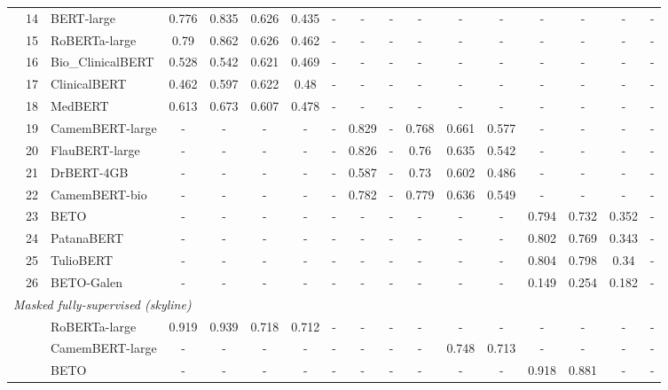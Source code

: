 {\begin{tabular}{lll|ccccc|ccccc|cccc}
 & 14 & BERT-large & 0.776 & 0.835 & 0.626 & 0.435 & - & - & - & - & - & - & - & - & - & - \\
 & 15 & RoBERTa-large & 0.79 & 0.862 & 0.626 & 0.462 & - & - & - & - & - & - & - & - & - & - \\
 & 16 & Bio\_ClinicalBERT & 0.528 & 0.542 & 0.621 & 0.469 & - & - & - & - & - & - & - & - & - & - \\
 & 17 & ClinicalBERT & 0.462 & 0.597 & 0.622 & 0.48 & - & - & - & - & - & - & - & - & - & - \\
 & 18 & MedBERT & 0.613 & 0.673 & 0.607 & 0.478 & - & - & - & - & - & - & - & - & - & - \\
 & 19 & CamemBERT-large & - & - & - & - & - & 0.829 & - & 0.768 & 0.661 & 0.577 & - & - & - & - \\
 & 20 & FlauBERT-large & - & - & - & - & - & 0.826 & - & 0.76 & 0.635 & 0.542 & - & - & - & - \\
 & 21 & DrBERT-4GB & - & - & - & - & - & 0.587 & - & 0.73 & 0.602 & 0.486 & - & - & - & - \\
 & 22 & CamemBERT-bio & - & - & - & - & - & 0.782 & - & 0.779 & 0.636 & 0.549 & - & - & - & - \\
 & 23 & BETO & - & - & - & - & - & - & - & - & - & - & 0.794 & 0.732 & 0.352 & - \\
 & 24 & PatanaBERT & - & - & - & - & - & - & - & - & - & - & 0.802 & 0.769 & 0.343 & - \\
 & 25 & TulioBERT & - & - & - & - & - & - & - & - & - & - & 0.804 & 0.798 & 0.34 & - \\
 & 26 & BETO-Galen & - & - & - & - & - & - & - & - & - & - & 0.149 & 0.254 & 0.182 & - \\
\midrule
\midrule
\multicolumn{17}{l}{\textit{Masked fully-supervised (skyline)}} \\
\midrule
 & & RoBERTa-large & 0.919 & 0.939 & 0.718 & 0.712 & - & - & - & - & - & - & - & - & - & - \\
 & & CamemBERT-large & - & - & - & - & - & - & - & - & 0.748 & 0.713 & - & - & - & - \\
 & & BETO & - & - & - & - & - & - & - & - & - & - & 0.918 & 0.881 & - & - \\
\bottomrule
\end{tabular}}